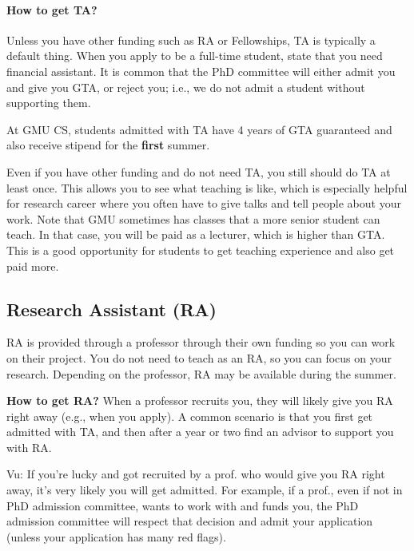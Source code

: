 \documentclass[11pt]{article}
\newenvironment{commentbox}{
 \small
    \begin{cbox}
 }{
   \end{cbox}
}
\begin{document}
\paragraph{How to get TA?}  Unless you have other funding such as RA or Fellowships, TA is typically a default thing. When you apply to be a full-time student,  state that you need financial assistant. It is common that the PhD committee will either admit you and give you GTA, or reject you; i.e., we do not admit a student without supporting them.  

\begin{commentbox}
At GMU CS, students admitted with TA have  4 years of GTA guaranteed and also receive  stipend for the \textbf{first} summer.
\end{commentbox}

Even if you have other funding and do not need TA, you still should do TA at least once.  This allows you to see what teaching is like, which is especially helpful for research career where you often have to give talks and tell people about your work. Note that GMU sometimes has classes that a more senior student can teach.  In that case, you will be paid as a lecturer, which is higher than GTA.  This is a good opportunity for students to get teaching experience and also get paid more.
\subsection{Research Assistant (RA)}
RA is provided through a professor through their own funding so you can work on their project.  
You do not need to teach as an RA, so you can focus on your research. Depending on the professor, RA may be available during the summer.

\textbf{How to get RA?} When a professor recruits you, they will likely give you RA right away (e.g., when you apply).  A common scenario is that you first get admitted with TA, and then after a year or two find an advisor to support you with RA. 



\begin{commentbox}
Vu: If you're lucky and got recruited by a prof. who would give you RA right away, it's very likely you will get admitted.  For example, if a prof., even if not in PhD admission committee, wants to work with and funds you, the PhD admission committee will respect that decision and admit your application (unless your application has many red flags).
\end{commentbox}
\end{document}
